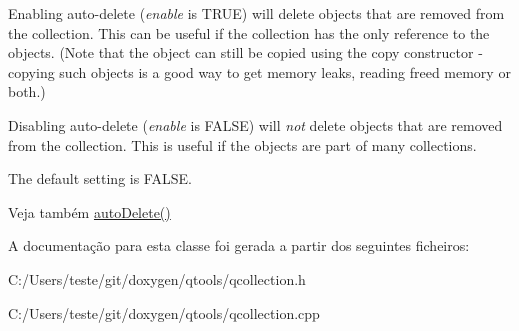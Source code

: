 Enabling auto-\/delete ({\itshape enable} is T\-R\-U\-E) will delete objects that are removed from the collection. This can be useful if the collection has the only reference to the objects. (Note that the object can still be copied using the copy constructor -\/ copying such objects is a good way to get memory leaks, reading freed memory or both.)

Disabling auto-\/delete ({\itshape enable} is F\-A\-L\-S\-E) will {\itshape not} delete objects that are removed from the collection. This is useful if the objects are part of many collections.

The default setting is F\-A\-L\-S\-E.

\begin{DoxySeeAlso}{Veja também}
\hyperlink{class_q_collection_a64c0f7f7f99c10922f570668b10acb2f}{auto\-Delete()} 
\end{DoxySeeAlso}


A documentação para esta classe foi gerada a partir dos seguintes ficheiros\-:\begin{DoxyCompactItemize}
\item 
C\-:/\-Users/teste/git/doxygen/qtools/qcollection.\-h\item 
C\-:/\-Users/teste/git/doxygen/qtools/qcollection.\-cpp\end{DoxyCompactItemize}
